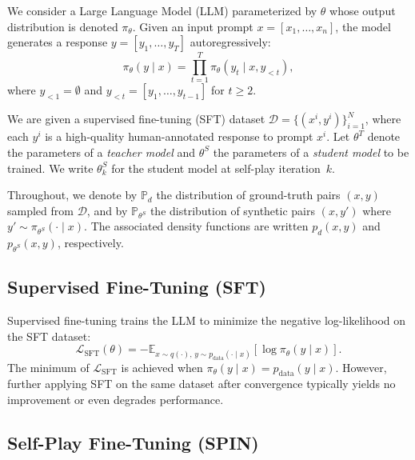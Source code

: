 \documentclass[11pt,a4paper]{article}
\newcommand{\Pd}{\mathbb{P}_d}
\newcommand{\Ps}{\mathbb{P}_{\theta^S}}
\newcommand{\E}{\mathbb{E}}
\begin{document}
We consider a Large Language Model (LLM) parameterized by $\theta$ whose output distribution is denoted $\pi_\theta$. Given an input prompt $x = [x_1, \ldots, x_n]$, the model generates a response $y = [y_1, \ldots, y_T]$ autoregressively:
\begin{equation}
    \pi_\theta(y \mid x) = \prod_{t=1}^{T} \pi_\theta(y_t \mid x, y_{<t}),
\end{equation}
where $y_{<1} = \emptyset$ and $y_{<t} = [y_1, \ldots, y_{t-1}]$ for $t \geq 2$.

We are given a supervised fine-tuning (SFT) dataset $\mathcal{D} = \{(x^i, y^i)\}_{i=1}^N$, where each $y^i$ is a high-quality human-annotated response to prompt $x^i$. Let $\theta^T$ denote the parameters of a \emph{teacher model} and $\theta^S$ the parameters of a \emph{student model} to be trained. We write $\theta^S_k$ for the student model at self-play iteration~$k$.

Throughout, we denote by $\Pd$ the distribution of ground-truth pairs $(x, y)$ sampled from $\mathcal{D}$, and by $\Ps$ the distribution of synthetic pairs $(x, y')$ where $y' \sim \pi_{\theta^S}(\cdot \mid x)$. The associated density functions are written $p_d(x, y)$ and $p_{\theta^S}(x, y)$, respectively.

\subsection{Supervised Fine-Tuning (SFT)}
\label{subsec:sft}

Supervised fine-tuning trains the LLM to minimize the negative log-likelihood on the SFT dataset:
\begin{equation}
    \mathcal{L}_{\mathrm{SFT}}(\theta) = -\E_{x \sim q(\cdot),\, y \sim p_{\mathrm{data}}(\cdot \mid x)} \left[ \log \pi_\theta(y \mid x) \right].
    \label{eq:sft}
\end{equation}
The minimum of $\mathcal{L}_{\mathrm{SFT}}$ is achieved when $\pi_\theta(y \mid x) = p_{\mathrm{data}}(y \mid x)$. However, further applying SFT on the same dataset after convergence typically yields no improvement or even degrades performance.

\subsection{Self-Play Fine-Tuning (SPIN)}
\label{subsec:spin}
\end{document}
